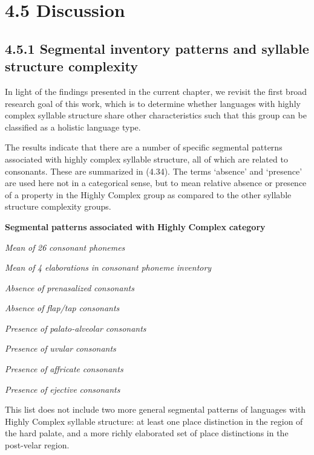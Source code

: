 \section{4.5 Discussion}
\subsection{4.5.1 Segmental inventory patterns and syllable structure complexity}

  In light of the findings presented in the current chapter, we revisit the first broad research goal of this work, which is to determine whether languages with highly complex syllable structure share other characteristics such that this group can be classified as a holistic language type.

  The results indicate that there are a number of specific segmental patterns associated with highly complex syllable structure, all of which are related to consonants. These are summarized in (4.34). The terms ‘absence’ and ‘presence’ are used here not in a categorical sense, but to mean relative absence or presence of a property in the Highly Complex group as compared to the other syllable structure complexity groups.

\ea\label{ex:(4.34)}
  \textbf{Segmental} \textbf{patterns} \textbf{associated} \textbf{with} \textbf{Highly} \textbf{Complex} \textbf{category}

\textit{Mean} \textit{of} \textit{26} \textit{consonant} \textit{phonemes}

\textit{Mean} \textit{of} \textit{4} \textit{elaborations} \textit{in} \textit{consonant} \textit{phoneme} \textit{inventory}

\textit{Absence} \textit{of} \textit{prenasalized} \textit{consonants}

\textit{Absence} \textit{of} \textit{flap/tap} \textit{consonants}

\textit{Presence} \textit{of} \textit{palato-alveolar} \textit{consonants}

\textit{Presence} \textit{of} \textit{uvular} \textit{consonants}

\textit{Presence} \textit{of} \textit{affricate} \textit{consonants} 

\textit{Presence} \textit{of} \textit{ejective} \textit{consonants}

\z

  This list does not include two more general segmental patterns of languages with Highly Complex syllable structure: at least one place distinction in the region of the hard palate, and a more richly elaborated set of place distinctions in the post-velar region.

